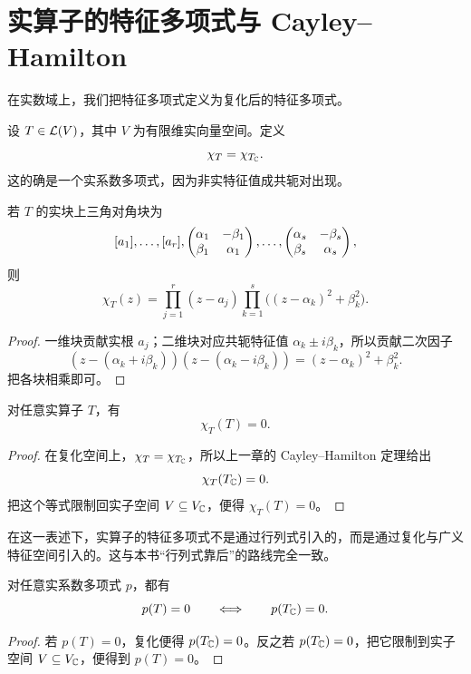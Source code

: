 \section{实算子的特征多项式与 Cayley--Hamilton}

在实数域上，我们把特征多项式定义为复化后的特征多项式。

\begin{definition}
设 $T\in\mathcal{L}(V)$，其中 $V$ 为有限维实向量空间。定义
\[
\chi_T=\chi_{T_{\mathbb{C}}}.
\]
这的确是一个实系数多项式，因为非实特征值成共轭对出现。
\end{definition}

\begin{proposition}
若 $T$ 的实块上三角对角块为
\[
[a_1],\dots,[a_r],\begin{pmatrix} \alpha_1&-\beta_1\\\beta_1&\alpha_1 \end{pmatrix},\dots,
\begin{pmatrix} \alpha_s&-\beta_s\\\beta_s&\alpha_s \end{pmatrix},
\]
则
\[
\chi_T(z)=\prod_{j=1}^r (z-a_j)\prod_{k=1}^s\big((z-\alpha_k)^2+\beta_k^2\big).
\]
\end{proposition}

\begin{proof}
一维块贡献实根 $a_j$；二维块对应共轭特征值 $\alpha_k\pm i\beta_k$，所以贡献二次因子
\[
(z-(\alpha_k+i\beta_k))(z-(\alpha_k-i\beta_k))=(z-\alpha_k)^2+\beta_k^2.
\]
把各块相乘即可。
\end{proof}

\begin{theorem}
对任意实算子 $T$，有
\[
\chi_T(T)=0.
\]
\end{theorem}

\begin{proof}
在复化空间上，$\chi_T=\chi_{T_{\mathbb{C}}}$，所以上一章的 Cayley--Hamilton 定理给出
\[
\chi_T(T_{\mathbb{C}})=0.
\]
把这个等式限制回实子空间 $V\subseteq V_{\mathbb{C}}$，便得 $\chi_T(T)=0$。
\end{proof}

\begin{remark}
在这一表述下，实算子的特征多项式不是通过行列式引入的，而是通过复化与广义特征空间引入的。这与本书“行列式靠后”的路线完全一致。
\end{remark}

\begin{proposition}
对任意实系数多项式 $p$，都有
\[
p(T)=0\qquad\Longleftrightarrow\qquad p(T_{\mathbb{C}})=0.
\]
\end{proposition}

\begin{proof}
若 $p(T)=0$，复化便得 $p(T_{\mathbb{C}})=0$。反之若 $p(T_{\mathbb{C}})=0$，把它限制到实子空间 $V\subseteq V_{\mathbb{C}}$，便得到 $p(T)=0$。
\end{proof}

